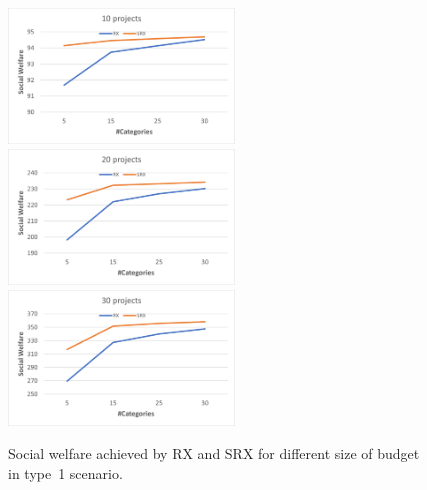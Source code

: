 \documentclass[runningheads]{llncs}
\begin{document}
\begin{subappendices}
\begin{figure}[t]
\begin{center}
\includegraphics[width=6cm]{simulation/unit_cost_sw_10.png}
\includegraphics[width=6cm]{simulation/unit_cost_sw_20.png}
\includegraphics[width=6cm]{simulation/unit_cost_sw_30.png}
\caption{Social welfare achieved by RX and SRX for different size of budget in type~1 scenario.
}\label{fig:sw_all1}
\end{center}
\end{figure}


\end{subappendices}
\end{document}
